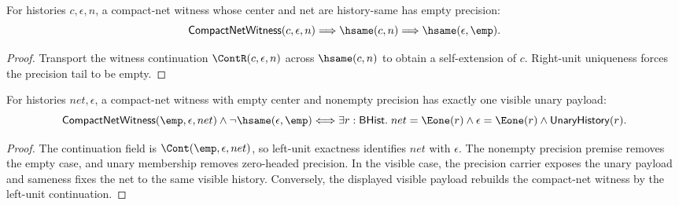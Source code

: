 \begin{theorem}
\label{thm:compact-net-witness-endpoint-cycle-precision-empty}
For histories $c,\epsilon,n$, a compact-net witness whose center and net are
history-same has empty precision:
$$
\mathsf{CompactNetWitness}(c,\epsilon,n)\Longrightarrow
\hsame(c,n)\Longrightarrow\hsame(\epsilon,\emp).
$$
\end{theorem}
\begin{proof}
Transport the witness continuation $\ContR(c,\epsilon,n)$ across
$\hsame(c,n)$ to obtain a self-extension of $c$. Right-unit uniqueness forces
the precision tail to be empty.
\end{proof}

\begin{theorem}
\label{thm:compact-empty-center-nonempty-precision-shape}
For histories $net,\epsilon$, a compact-net witness with empty center and
nonempty precision has exactly one visible unary payload:
$$
\mathsf{CompactNetWitness}(\emp,\epsilon,net)\wedge\neg\hsame(\epsilon,\emp)
\Longleftrightarrow
\exists r:\mathsf{BHist}.\;
net=\Eone(r)\wedge \epsilon=\Eone(r)\wedge\mathsf{UnaryHistory}(r).
$$
\end{theorem}
\begin{proof}
The continuation field is $\Cont(\emp,\epsilon,net)$, so left-unit exactness
identifies $net$ with $\epsilon$. The nonempty precision premise removes the
empty case, and unary membership removes zero-headed precision. In the visible
case, the precision carrier exposes the unary payload and sameness fixes the
net to the same visible history. Conversely, the displayed visible payload
rebuilds the compact-net witness by the left-unit continuation.
\end{proof}

